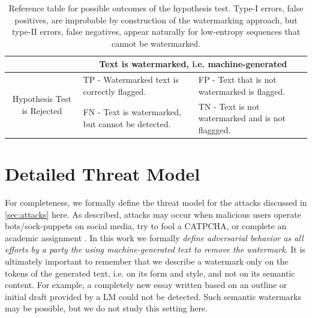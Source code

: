 \documentclass{article}
\theoremstyle{plain}
\theoremstyle{definition}
\theoremstyle{remark}
\begin{document}
\begin{table}
\small 
\begin{tabular}{@{}c|l|l@{}}
\multicolumn{1}{l}{}                         & \multicolumn{2}{c}{Text is watermarked, i.e. machine-generated}                                                                                              \\ \midrule
\multirow{2}{*}{Hypothesis Test is Rejected} & TP - Watermarked text is correctly flagged.                                & FP -  Text that is not watermarked is flagged. \\
                                             & FN - Text is watermarked, but cannot be detected. & TN - Text is not watermarked and is not flaggged.            
\end{tabular}
\caption{Reference table for possible outcomes of the hypothesis test. Type-I errors, false positives, are improbable by construction of the watermarking approach, but type-II errors, false negatives, appear naturally for low-entropy sequences that cannot be watermarked.}
\label{tab:explanation_for_dummies}
\end{table}
\section{Detailed Threat Model}

For completeness, we formally define the threat model for the attacks discussed in \cref{sec:attacks} here. As described, attacks may occur when malicious users operate bots/sock-puppets on social media, try to fool a CATPCHA, or complete an academic assignment  \citep{foltynek_academic_2019}. 
In this work we formally \textit{define adversarial behavior as all efforts by a party the using machine-generated text to remove the watermark}.
It is ultimately important to remember that we describe a watermark only on the tokens of the generated text, i.e. on its form and style, and not on its semantic content. For example, a completely new essay written based on an outline or initial draft provided by a LM could not be detected. Such semantic watermarks may be possible, but we do not study this setting here.
\end{document}
